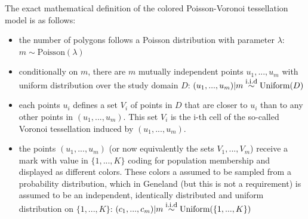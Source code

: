 \documentclass{article}
\begin{document}
The exact mathematical definition of the colored Poisson-Voronoi tessellation model is as follows:
\begin{itemize}
\item the number of polygons follows a Poisson distribution with parameter $\lambda$: $m \sim \mbox{Poisson}(\lambda)$
\item conditionally on $m$, there are $m$ mutually independent points $u_1,...,u_m$ with uniform distribution over the study domain $D$:
$(u_1,...,u_m) |m \stackrel{\mbox{\footnotesize i.i.d}}{\sim} \mbox{Uniform}(D)$ 
\item each points $u_i$ defines a set $V_i$ of points in $D$ that are closer to $u_i$ than to any other points in $(u_1,...,u_m)$. 
This set $V_i$ is the i-th cell of the so-called Voronoi tessellation induced by $(u_1,...,u_m)$.
\item the points $(u_1,...,u_m)$ (or now equivalently the sets $V_1,...,V_m$) receive a mark with value in $\{1,...,K\}$ 
coding for population membership and displayed as different colors. These colors a assumed to be sampled from a probability distribution, 
which in {\sc Geneland} (but this is not a requirement) is assumed to be an independent, identically 
distributed and uniform distribution on $\{1,...,K\}$: 
$(c_1,...,c_m) |m \stackrel{\mbox{\footnotesize i.i.d}}{\sim} \mbox{Uniform}(\{1,...,K\})$ 
\end{itemize}
\end{document}
